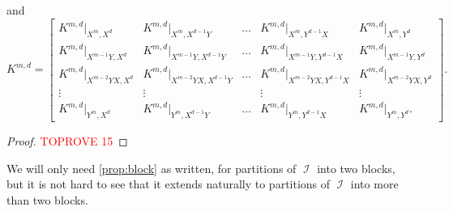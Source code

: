 \documentclass{article}
\theoremstyle{remark}
\theoremstyle{definition}
\DeclareMathOperator{\ic}{\mathcal{I}}
\begin{document}
and
\[
    K^{m,d} =
    \begin{bmatrix} 
        K^{m,d}|_{X^{m},X^{d}} &
        K^{m,d}|_{X^{m},X^{d-1}Y} & \ldots &
        K^{m,d}|_{X^{m},Y^{d-1}X} & 
        K^{m,d}|_{X^{m},Y^{d}}\\
        K^{m,d}|_{X^{m-1}Y,X^{d}} &
        K^{m,d}|_{X^{m-1}Y,X^{d-1}Y} & \ldots & 
        K^{m,d}|_{X^{m-1}Y,Y^{d-1}X} & 
        K^{m,d}|_{X^{m-1}Y,Y^{d}}\\
        K^{m,d}|_{X^{m-2}YX,X^{d}} & 
        K^{m,d}|_{X^{m-2}YX,X^{d-1}Y} &\ldots & 
        K^{m,d}|_{X^{m-2}YX,Y^{d-1}X} & 
        K^{m,d}|_{X^{m-2}YX,Y^{d}} \\
        \vdots & \vdots && \vdots & \vdots \\
        K^{m,d}|_{Y^{m},X^{d}} &
        K^{m,d}|_{Y^{m},X^{d-1}Y} & \ldots & 
        K^{m,d}|_{Y^{m},Y^{d-1}X} &
        K^{m,d}|_{Y^{m},Y^{d}}.
    \end{bmatrix}.
\]
\begin{proof}\textcolor{red}{TOPROVE 15}\end{proof}
We will only need \autoref{prop:block} as written, for partitions of $\ic$ into two blocks, but it is
not hard to see that it extends naturally to partitions of $\ic$ into more than two blocks.
\end{document}
